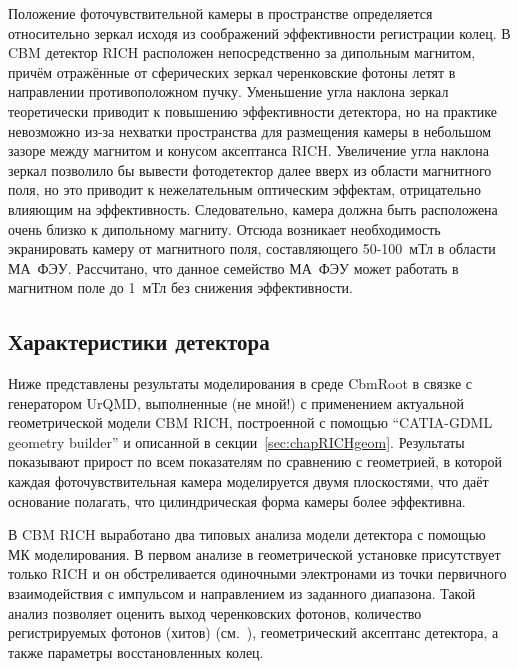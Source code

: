 
Положение фоточувствительной камеры в пространстве определяется относительно зеркал исходя из соображений эффективности регистрации колец. В CBM детектор RICH расположен непосредственно за дипольным магнитом, причём отражённые от сферических зеркал черенковские фотоны летят в направлении противоположном пучку. Уменьшение угла наклона зеркал теоретически приводит к повышению эффективности детектора, но на практике невозможно из-за нехватки пространства для размещения камеры в небольшом зазоре между магнитом и конусом аксептанса RICH. Увеличение угла наклона зеркал позволило бы вывести фотодетектор далее вверх из области магнитного поля, но это приводит к нежелательным оптическим эффектам, отрицательно влияющим на эффективность. Следовательно, камера должна быть расположена очень близко к дипольному магниту. Отсюда возникает необходимость экранировать камеру от магнитного поля, составляющего 50-100~мТл в области МА~ФЭУ. Рассчитано, что данное семейство МА~ФЭУ может работать в магнитном поле до 1~мТл без снижения эффективности.

\subsection{Характеристики детектора}

Ниже представлены результаты моделирования в среде CbmRoot в связке с генератором UrQMD, выполненные (\todo не мной!) с применением актуальной геометрической модели CBM RICH, построенной с помощью ``CATIA-GDML geometry builder'' и описанной в секции~\ref{sec:chapRICHgeom}.
Результаты показывают прирост по всем показателям по сравнению с геометрией, в которой каждая фоточувствительная камера моделируется двумя плоскостями, что даёт основание полагать, что цилиндрическая форма камеры более эффективна.

В CBM RICH выработано два типовых анализа модели детектора с помощью МК моделирования. В первом анализе в геометрической установке присутствует только RICH и он обстреливается одиночными электронами из точки первичного взаимодействия с импульсом и направлением из заданного диапазона. Такой анализ позволяет оценить выход черенковских фотонов, количество регистрируемых фотонов (хитов) (см.~), геометрический аксептанс детектора, а также параметры восстановленных колец.

